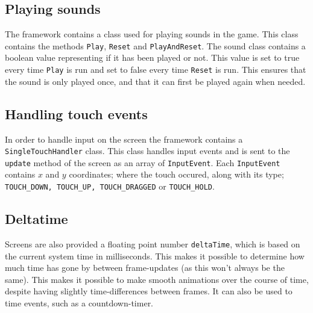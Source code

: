 \subsection{Playing sounds}
The framework contains a class used for playing sounds in the game. 
This class contains the methods \lstinline|Play|, \lstinline|Reset| and \lstinline|PlayAndReset|.
The sound class contains a boolean value representing if it has been played or not. 
This value is set to true every time \lstinline|Play| is run and set to false every time \lstinline|Reset| is run.
This ensures that the sound is only played once, and that it can first be played again when needed.

\subsection{Handling touch events}\label{framework:touchevents}
In order to handle input on the screen the framework contains a \lstinline|SingleTouchHandler| class.
This class handles input events and is sent to the \lstinline|update| method of the screen as an array of \lstinline|InputEvent|.
Each \lstinline|InputEvent| contains $x$ and $y$ coordinates; where the touch occured, along with its type; \lstinline|TOUCH_DOWN, TOUCH_UP, TOUCH_DRAGGED| or \lstinline|TOUCH_HOLD|.

\subsection{Deltatime}\label{framework:deltatime}
Screens are also provided a floating point number \lstinline|deltaTime|, which is based on the current system time in milliseconds.
This makes it possible to determine how much time has gone by between frame-updates (as this won't always be the same).
This makes it possible to make smooth animations over the course of time, despite having slightly time-differences between frames.
It can also be used to time events, such as a countdown-timer.